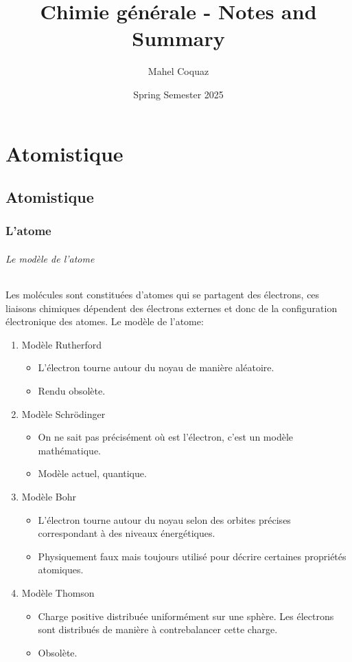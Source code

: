 \documentclass[10pt,a4paper]{book}
\title{Chimie générale \vspace{0.2cm} - Notes and Summary}
\author{Mahel Coquaz}
\date{Spring Semester 2025}
\begin{document}
\maketitle
\tableofcontents
\newpage
\part*{Atomistique}
\chapter{Atomistique}
\section{L'atome}
\paragraph{Le modèle de l'atome}
Les molécules sont constituées d'atomes qui se partagent des électrons, ces liaisons chimiques dépendent des électrons externes et donc de la configuration électronique des atomes.
Le modèle de l'atome:
\begin{enumerate}
\item Modèle Rutherford
\begin{itemize}
\item L'électron tourne autour du noyau de manière aléatoire.
\item Rendu obsolète.
\end{itemize}
\item Modèle Schrödinger
\begin{itemize}
\item On ne sait pas précisément où est l’électron, c'est un modèle mathématique.
\item Modèle actuel, quantique.
\end{itemize}
\item Modèle Bohr
\begin{itemize}
\item L'électron tourne autour du noyau selon des orbites précises correspondant à des niveaux énergétiques.
\item Physiquement faux mais toujours utilisé pour décrire certaines propriétés atomiques.
\end{itemize}
\item Modèle Thomson
\begin{itemize}
\item Charge positive distribuée uniformément sur une sphère. Les électrons sont distribués de manière à contrebalancer cette charge.
\item Obsolète.
\end{itemize}
\end{enumerate}
\newpage
\end{document}
